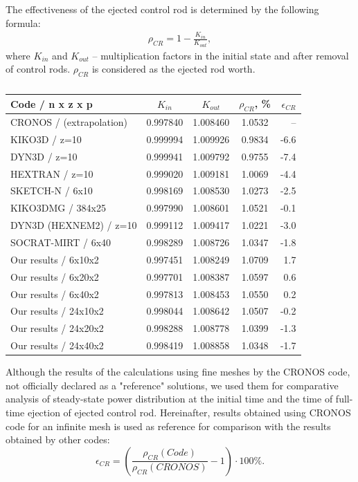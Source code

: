 \documentclass{aip-cp}
\begin{document}
The effectiveness of the ejected control rod is determined by the following formula:
\begin{eqnarray*}
\rho_{CR} = 1 - \frac{K_{in}}{K_{out}},
\end{eqnarray*}
where $K_{in}$ and $K_{out}$ -- multiplication factors
in the initial state and after removal of control rods.
$\rho_{CR}$ is considered as the ejected rod worth.

\begin{table}[!h]
\caption{}
\label{t-5}
\begin{tabular}{lcccr}
\hline
Code / n x z x p & $K_{in}$ & $K_{out}$ &  $\rho_{CR}$, \% &  $\epsilon_{CR}$ \\ 
\hline
CRONOS / (extrapolation)& 0.997840 & 1.008460 & 1.0532 & -- \\
KIKO3D / z=10 			& 0.999994 & 1.009926 & 0.9834 & -6.6 \\
DYN3D / z=10 			& 0.999941 & 1.009792 & 0.9755 & -7.4 \\
HEXTRAN / z=10			& 0.999020 & 1.009181 & 1.0069 & -4.4 \\
SKETCH-N / 6x10			& 0.998169 & 1.008530 & 1.0273 & -2.5 \\
KIKO3DMG / 384x25		& 0.997990 & 1.008601 & 1.0521 & -0.1 \\
DYN3D (HEXNEM2) / z=10	& 0.999112 & 1.009417 & 1.0221 & -3.0 \\
SOCRAT-MIRT / 6x40      & 0.998289 & 1.008726 & 1.0347 & -1.8 \\
Our results / 6x10x2    & 0.997451 & 1.008249 & 1.0709 & 1.7 \\
Our results / 6x20x2    & 0.997701 & 1.008387 & 1.0597 & 0.6 \\
Our results / 6x40x2    & 0.997813 & 1.008453 & 1.0550 & 0.2 \\
Our results / 24x10x2   & 0.998044 & 1.008642 &	1.0507 & -0.2 \\
Our results / 24x20x2   & 0.998288 & 1.008778 &	1.0399 & -1.3 \\
Our results / 24x40x2   & 0.998419 & 1.008858 &	1.0348 & -1.7 \\
\hline
\end{tabular}
\end{table}

Although the results of the calculations using fine meshes by the CRONOS \cite{cronos} code, not officially declared as a "reference" solutions, we used them for comparative analysis of steady-state power distribution at the initial time and the time of full-time ejection of ejected control rod. Hereinafter, results obtained using CRONOS code for an infinite mesh is used as reference for comparison with the results obtained by other codes:
\[
\epsilon_{CR} = (\frac{\rho_{CR}(Code)}{\rho_{CR}(CRONOS)}-1)\cdot 100 \%.
\]
\end{document}
